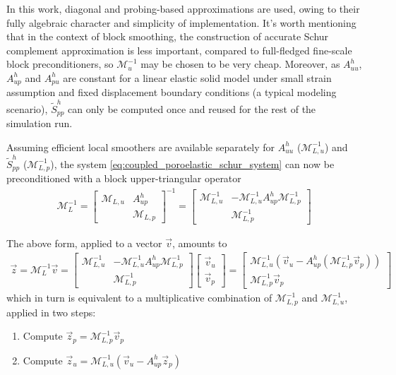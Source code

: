 In this work, diagonal and probing-based approximations are used, owing to their fully algebraic character and simplicity of implementation.   It's worth mentioning that in the context of block smoothing, the construction of accurate Schur complement approximation is less important, compared to full-fledged fine-scale block preconditioners, so $\mathcal{M}_u^{-1}$ may be chosen to be very cheap.   Moreover, as $A_{uu}^h$, $A_{up}^h$ and $A_{pu}^h$ are constant for a linear elastic solid model under small strain assumption and fixed displacement boundary conditions (a typical modeling scenario), $\tilde{S}_{pp}^h$ can only be computed once and reused for the rest of the simulation run.

Assuming efficient local smoothers are available separately for $A_{uu}^h$ ($\mathcal{M}_{L,u}^{-1}$) and $\tilde{S}_{pp}^h$ ($\mathcal{M}_{L,p}^{-1}$), the system \eqref{eq:coupled_poroelastic_schur_system} can now be preconditioned with a block upper-triangular operator
\begin{align}
    \mathcal{M}_L^{-1} =
    \begin{bmatrix}
        \mathcal{M}_{L,u} & A_{up}^h          \\
                          & \mathcal{M}_{L,p}
    \end{bmatrix}^{-1}
    =
    \begin{bmatrix}
        \mathcal{M}_{L,u}^{-1} & -\mathcal{M}_{L,u}^{-1} A_{up}^h \mathcal{M}_{L,p}^{-1} \\
                               &  \mathcal{M}_{L,p}^{-1}
    \end{bmatrix}
\end{align}

The above form, applied to a vector $\vec{v}$, amounts to
\begin{align}
    \vec{z} = \mathcal{M}_L^{-1}\vec{v} = 
    \begin{bmatrix}
        \mathcal{M}_{L,u}^{-1} & -\mathcal{M}_{L,u}^{-1} A_{up}^h \mathcal{M}_{L,p}^{-1} \\
                               &  \mathcal{M}_{L,p}^{-1}
    \end{bmatrix}
    \begin{bmatrix}
        \vec{v}_u \\
        \vec{v}_p
    \end{bmatrix}
    =
    \begin{bmatrix}
        \mathcal{M}_{L,u}^{-1} \left(\vec{v}_u - A_{up}^h (\mathcal{M}_{L,p}^{-1} \vec{v}_p)\right) \\
        \mathcal{M}_{L,p}^{-1} \vec{v}_p
    \end{bmatrix}
\end{align}
which in turn is equivalent to a multiplicative combination of $\mathcal{M}_{L,p}^{-1}$ and $\mathcal{M}_{L,u}^{-1}$, applied in two steps:
\begin{enumerate}
    \item Compute $\vec{z}_p = \mathcal{M}_{L,p}^{-1} \vec{v}_p$
    \item Compute $\vec{z}_u = \mathcal{M}_{L,u}^{-1}(\vec{v}_u - A_{up}^h \vec{z}_p)$
\end{enumerate}

